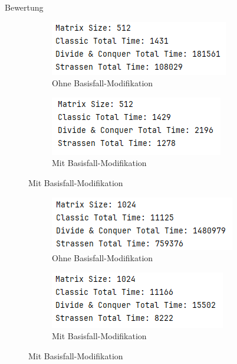 \documentclass{beamer}
\begin{document}
\begin{frame}{Bewertung}
{     {
        \begin{figure}[H]
            \centering
            \begin{subfigure}[b]{0.4\textwidth}
                \includegraphics[width=\textwidth]{512Without.PNG}
                \caption{Ohne Basisfall-Modifikation}
            \end{subfigure}
            \begin{subfigure}[b]{0.4\textwidth}
                \includegraphics[width=\textwidth]{512With.PNG}
                \caption{Mit Basisfall-Modifikation}
            \end{subfigure}
        \end{figure}
    }
     {
        \begin{figure}[H]
            \centering
            \begin{subfigure}[b]{0.4\textwidth}
                \includegraphics[width=\textwidth]{1024Without.PNG}
                \caption{Ohne Basisfall-Modifikation}
            \end{subfigure}
            \begin{subfigure}[b]{0.4\textwidth}
                \includegraphics[width=\textwidth]{1024With.PNG}
                \caption{Mit Basisfall-Modifikation}
            \end{subfigure}
        \end{figure}
    }
    }
    \pause[4]
\end{frame}
\end{document}
